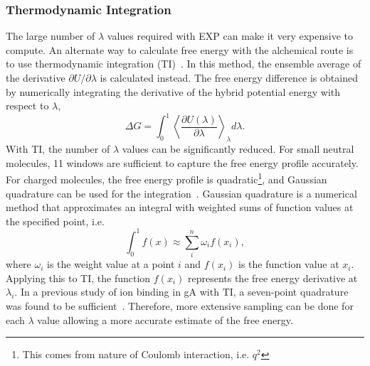 \subsubsection{Thermodynamic Integration}
The large number of $\lambda$ values required with EXP can make it very expensive to compute. 
An alternate way to calculate free energy with the alchemical route is to use thermodynamic 
integration (TI)~\cite{Beveridge1989}. In this method, the ensemble average of the derivative 
$\partial U/\partial \lambda$ is calculated instead. The free energy difference is obtained by 
numerically integrating the derivative of the hybrid potential energy with respect to $\lambda$,
\begin{equation}
\Delta G = \int_{0}^{1} \left\langle \frac{\partial U(\lambda)}{\partial \lambda} \right\rangle_{\lambda} d\lambda.
\end{equation}
With TI, the number of $\lambda$ values can be significantly reduced. For small neutral molecules, 
11 windows are sufficient to capture the free energy profile accurately. For charged molecules, 
the free energy profile is quadratic\footnote{This comes from nature of Coulomb interaction, i.e. 
$q^2$}, and Gaussian quadrature can be used for the integration~\cite{press2007numerical}. 
Gaussian quadrature is a numerical method that approximates an integral with weighted sums of 
function values at the specified point, i.e. 
\begin{equation}
\int_{0}^{1} f(x) \approx \sum_{i}^{n} \omega_{i} f(x_{i}),
\end{equation} 
where $\omega_{i}$ is the weight value at a point $i$ and $f(x_{i})$ is the function value at $x_{i}$. 
Applying this to TI, the function $f(x_{i})$ represents the free energy derivative at $\lambda_{i}$. 
In a previous study of ion binding in gA with TI, a seven-point quadrature was found to be 
sufficient~\cite{Bastug2006c}. Therefore, more extensive sampling can be done for each $\lambda$ 
value allowing a more accurate estimate of the free energy.

